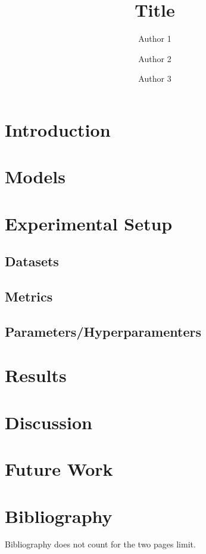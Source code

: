 \documentclass[twocolumn,10pt]{article}
\title{Title}
\author{Author 1}
\author{Author 2}
\author{Author 3}
\affil{Group XXX\\ Instituto Superior Técnico, Universidade de Lisboa}
\begin{document}
\maketitle

\section{Introduction}

\section{Models}

\section{Experimental Setup}
 
\subsection{Datasets}

\subsection{Metrics}

\subsection{Parameters/Hyperparamenters}

\section{Results}

\section{Discussion} 

\section{Future Work}

\section*{Bibliography}



Bibliography does not count for the two pages limit.
\end{document}
